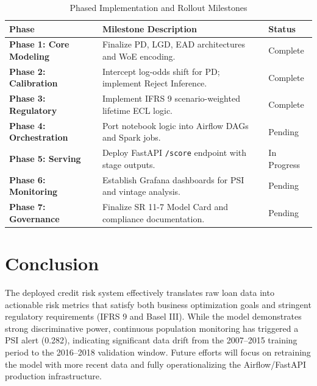 \documentclass[12pt,a4paper]{article}
\begin{document}
\begin{table}[H]
\centering
\caption{Phased Implementation and Rollout Milestones}
\label{tab:timeline}
\begin{tabularx}{\textwidth}{@{}lXl@{}}
\toprule
\textbf{Phase} & \textbf{Milestone Description} & \textbf{Status} \\ \midrule
\textbf{Phase 1: Core Modeling} & Finalize PD, LGD, EAD architectures and WoE encoding. & Complete \\
\textbf{Phase 2: Calibration} & Intercept log-odds shift for PD; implement Reject Inference. & Complete \\
\textbf{Phase 3: Regulatory} & Implement IFRS 9 scenario-weighted lifetime ECL logic. & Complete \\
\textbf{Phase 4: Orchestration} & Port notebook logic into Airflow DAGs and Spark jobs. & Pending \\
\textbf{Phase 5: Serving} & Deploy FastAPI \texttt{/score} endpoint with stage outputs. & In Progress \\
\textbf{Phase 6: Monitoring} & Establish Grafana dashboards for PSI and vintage analysis. & Pending \\
\textbf{Phase 7: Governance} & Finalize SR 11-7 Model Card and compliance documentation. & Pending \\ \bottomrule
\end{tabularx}
\end{table}

\section{Conclusion}
The deployed credit risk system effectively translates raw loan data into actionable risk metrics that satisfy both business optimization goals and stringent regulatory requirements (IFRS 9 and Basel III). While the model demonstrates strong discriminative power, continuous population monitoring has triggered a PSI alert (0.282), indicating significant data drift from the 2007--2015 training period to the 2016--2018 validation window. Future efforts will focus on retraining the model with more recent data and fully operationalizing the Airflow/FastAPI production infrastructure.
\end{document}
